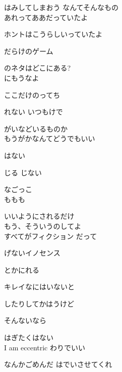はみしてしまおう なんてそんなもの
\\

あれってああだっていたよ

ホントはこうらしいっていたよ

だらけのゲーム

のネタはどこにある?
\\

にもうなよ

ここだけのってち

れない いつもけで

がいなどいるものか
\\

もうがかなんてどうでもいい

はない

じる じない

なごっこ
\\

ももも

いいようにされるだけ
\\

もう、そういうのしてよ
\\

すべてがフィクション だって

げないイノセンス

とかにれる

キレイなにはいないと

したりしてかはうけど

そんないなら

はぎたくはない
\\

I am eccentric わりでいい

なんかごめんだ はでいさせてくれ

